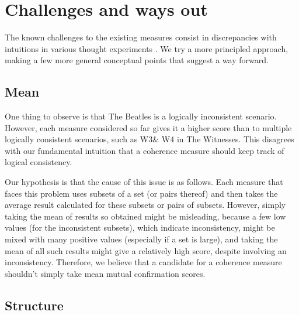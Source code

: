 \documentclass[10pt,]{scrartcl}
\begin{document}
\section{Challenges and ways out}


The known challenges to the existing measures  consist in discrepancies with intuitions in various thought experiments  . We try a more principled approach,  making a few more general conceptual points that suggest a way forward. 
















\subsection{Mean}\label{sec:mean}

One thing to observe is that \textsf{The Beatles} is a logically inconsistent scenario. However, each  measure considered so far gives it a higher score than to multiple  logically consistent scenarios, such as \textsf{W3}\& \textsf{W4} in  \textsf{The Witnesses}. This  disagrees with our fundamental
intuition that a coherence measure should keep track of logical
consistency. 






Our hypothesis is that the cause of this issue is as follows. Each measure that faces this problem  uses subsets of a set (or pairs thereof) and then takes the average
result calculated for these subsets or pairs of subsets. However, simply
taking the mean of results so obtained might be misleading, because a
few low values (for the inconsistent subsets), which indicate
inconsistency, might be mixed with many positive values (especially if a
set is large), and taking the mean of all such results might give a
relatively high score, despite involving an inconsistency. Therefore, we
believe that a candidate for a coherence measure shouldn't simply take
mean mutual confirmation scores.

\subsection{Structure}
\end{document}
